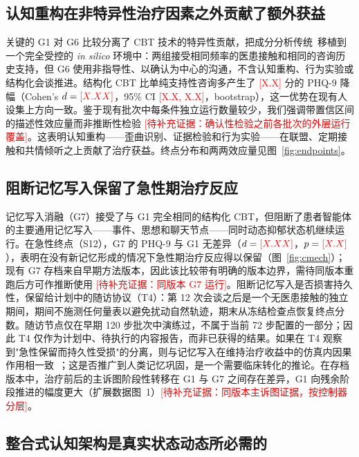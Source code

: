\documentclass[11pt,a4paper]{article}
\newcommand{\ph}[1]{\textcolor{red}{[#1]}}
\begin{document}
\subsection*{认知重构在非特异性治疗因素之外贡献了额外获益}

关键的 G1 对 G6 比较分离了 CBT 技术的特异性贡献，把成分分析传统~\cite{jacobson1996}移植到一个完全受控的 \emph{in silico} 环境中：两组接受相同频率的医患接触和相同的咨询历史支持，但 G6 使用非指导性、以确认为中心的沟通，不含认知重构、行为实验或结构化会谈推进。结构化 CBT 比单纯支持性咨询多产生了 \ph{X.X} 分的 PHQ-9 降幅（Cohen's $d = \ph{X.XX}$，95\% CI \ph{X.X, X.X}，bootstrap），这一优势在现有人设集上方向一致。鉴于现有批次中每条件独立运行数量较少，我们强调带置信区间的描述性效应量而非推断性检验 \ph{待补充证据：确认性检验之前各批次的外层运行覆盖}。这表明认知重构——歪曲识别、证据检验和行为实验——在联盟、定期接触和共情倾听之上贡献了治疗获益。终点分布和两两效应量见图~\ref{fig:endpoints}。

\subsection*{阻断记忆写入保留了急性期治疗反应}

记忆写入消融（G7）接受了与 G1 完全相同的结构化 CBT，但阻断了患者智能体的主要通用记忆写入——事件、思想和聊天节点——同时动态抑郁状态机继续运行。在急性终点（S12），G7 的 PHQ-9 与 G1 无差异（$d = \ph{X.XX}$，$p = \ph{X.X}$），表明在没有新记忆形成的情况下急性期治疗反应得以保留（图~\ref{fig:cmech}）；现有 G7 存档来自早期方法版本，因此该比较带有明确的版本边界，需待同版本重跑后方可作推断使用 \ph{待补充证据：同版本 G7 运行}。阻断记忆写入是否损害持久性，保留给计划中的随访协议（T4）：第 12 次会谈之后是一个无医患接触的独立期间，期间不施测任何量表以避免扰动自然轨迹，期末从冻结检查点恢复终点分数。随访节点仅在早期 120 步批次中演练过，不属于当前 72 步配置的一部分；因此 T4 仅作为计划中、待执行的内容报告，而非已获得的结果。如果在 T4 观察到"急性保留而持久性受损"的分离，则与记忆写入在维持治疗收益中的仿真内因果作用相一致~\cite{teasdale1988,spens2024}；这是否推广到人类记忆巩固，是一个需要临床转化的推论。在存档版本中，治疗前后的主诉图阶段性转移在 G1 与 G7 之间存在差异，G1 向残余阶段推进的幅度更大（扩展数据图~1）\ph{待补充证据：同版本主诉图证据，按控制器分层}。

\subsection*{整合式认知架构是真实状态动态所必需的}
\end{document}
